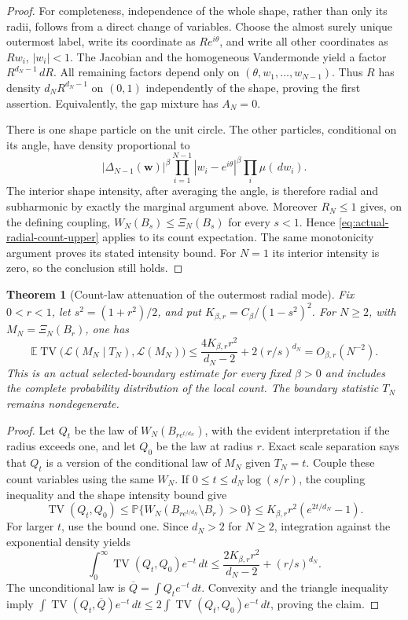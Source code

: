 \documentclass[11pt]{article}
\newcommand{\E}{\mathbb E}
\newcommand{\Pp}{\mathbb P}
\newcommand{\dd}{\,d}
\DeclareMathOperator{\TV}{TV}
\newtheorem{theorem}{Theorem}[section]
\theoremstyle{remark}\newtheorem{remark}[theorem]{Remark}
\begin{document}
\begin{proof}
For completeness, independence of the whole shape, rather than only
its radii, follows from a direct change of variables. Choose the
almost surely unique outermost label, write its coordinate as
$R e^{i\theta}$, and write all other coordinates as $R w_i$,
$|w_i|<1$. The Jacobian and the homogeneous Vandermonde yield a
factor $R^{d_N-1}\dd R$. All remaining factors depend only on
$(\theta,w_1,\ldots,w_{N-1})$. Thus $R$ has density
$d_N R^{d_N-1}$ on $(0,1)$ independently of the shape, proving
the first assertion. Equivalently, the gap mixture has $A_N=0$.

There is one shape particle on the unit circle. The other particles,
conditional on its angle, have density proportional to
\[
 |\Delta_{N-1}(\mathbf w)|^\beta
 \prod_{i=1}^{N-1}|w_i-e^{i\theta}|^\beta
 \prod_i\mu(\dd w_i).
\]
The interior shape intensity, after averaging the angle, is therefore
radial and subharmonic by exactly the marginal argument above.
Moreover $R_N\le1$ gives, on the defining coupling,
$W_N(B_s)\le\Xi_N(B_s)$ for every $s<1$. Hence
\eqref{eq:actual-radial-count-upper} applies to its count expectation.
The same monotonicity argument proves its stated intensity bound.
For $N=1$ its interior intensity is zero, so the conclusion still holds.
\end{proof}

\begin{theorem}[Count-law attenuation of the outermost radial mode]
\label{thm:radial-count-screening}
Fix $0<r<1$, let $s^2=(1+r^2)/2$, and put
$K_{\beta,r}=C_\beta/(1-s^2)^2$.
For $N\ge2$, with $M_N=\Xi_N(B_r)$, one has
\begin{equation}\label{eq:radial-count-TV}
 \E\TV\bigl(\mathcal L(M_N\mid T_N),\mathcal L(M_N)\bigr)
 \le\frac{4K_{\beta,r}r^2}{d_N-2}
           +2(r/s)^{d_N}
 =O_{\beta,r}(N^{-2}).
\end{equation}
This is an actual selected-boundary estimate for every fixed
$\beta>0$ and includes the complete probability distribution of
the local count. The boundary statistic $T_N$ remains nondegenerate.
\end{theorem}

\begin{proof}
Let $Q_t$ be the law of $W_N(B_{r e^{t/d_N}})$, with the evident
interpretation if the radius exceeds one, and let $Q_0$ be the law
at radius $r$. Exact scale separation says that $Q_t$ is a version
of the conditional law of $M_N$ given $T_N=t$. Couple these count
variables using the same $W_N$. If
$0\le t\le d_N\log(s/r)$, the coupling inequality and the shape
intensity bound give
\[
 \TV(Q_t,Q_0)
 \le \Pp\{W_N(B_{r e^{t/d_N}}\setminus B_r)>0\}
 \le K_{\beta,r}r^2(e^{2t/d_N}-1).
\]
For larger $t$, use the bound one. Since $d_N>2$ for $N\ge2$,
integration against the exponential density yields
\[
 \int_0^\infty\TV(Q_t,Q_0)e^{-t}\dd t
 \le\frac{2K_{\beta,r}r^2}{d_N-2}+(r/s)^{d_N}.
\]
The unconditional law is $\overline Q=\int Q_t e^{-t}\dd t$.
Convexity and the triangle inequality imply
$\int\TV(Q_t,\overline Q)e^{-t}\dd t
 \le2\int\TV(Q_t,Q_0)e^{-t}\dd t$,
proving the claim.
\end{proof}
\end{document}
